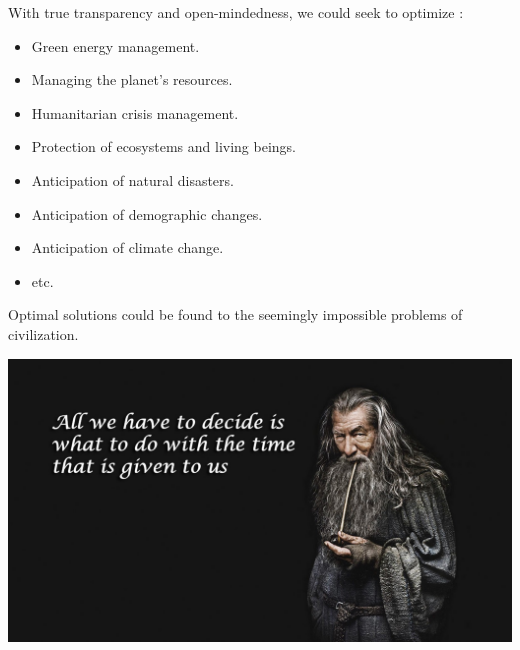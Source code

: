 With true transparency and open-mindedness, we could seek to optimize :\\

\begin{itemize}
\item Green energy management.
\item Managing the planet's resources.
\item Humanitarian crisis management.
\item Protection of ecosystems and living beings.
\item Anticipation of natural disasters.
\item Anticipation of demographic changes.
\item Anticipation of climate change.
\item etc.\\
\end{itemize}

Optimal solutions could be found to the seemingly impossible problems of civilization.\\

\vspace{1cm}

\begin{center}
\includegraphics[scale=0.22]{Media/GandalfQuote.jpg}
\end{center}